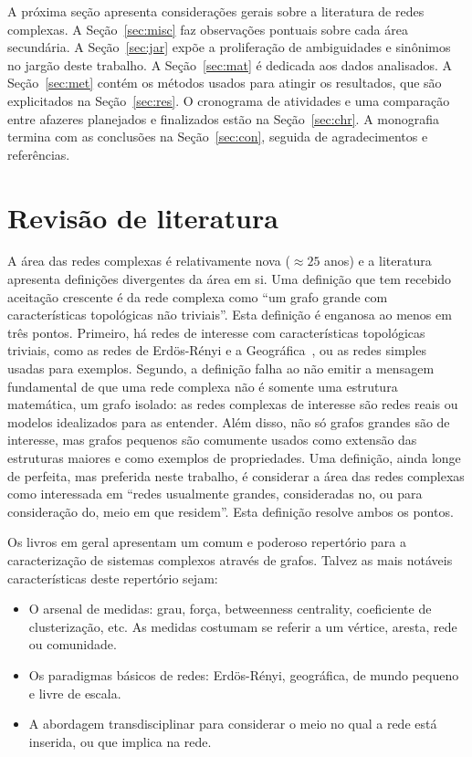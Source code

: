 \documentclass[a4paper,openright,12pt]{report} %
\begin{document}
A próxima seção apresenta considerações gerais sobre a literatura de redes complexas.
A Seção~\ref{sec:misc} faz observações pontuais sobre cada área secundária.
A Seção~\ref{sec:jar} expõe a proliferação de ambiguidades e sinônimos
no jargão deste trabalho.
A Seção~\ref{sec:mat} é dedicada aos dados analisados.
A Seção~\ref{sec:met} contém os métodos usados para atingir os resultados, que são explicitados na Seção~\ref{sec:res}. O cronograma de atividades e uma comparação entre afazeres planejados e finalizados
estão na Seção~\ref{sec:chr}.
A monografia termina com as conclusões na Seção~\ref{sec:con}, seguida de agradecimentos e referências.

\section{Revisão de literatura}
A área das redes complexas é relativamente nova ($\approx 25$ anos)
e a literatura apresenta definições divergentes da área em si.
Uma definição que tem recebido aceitação crescente
é da rede complexa como ``um grafo grande com características topológicas
não triviais''. Esta definição é enganosa ao menos em três pontos.
Primeiro, há redes de interesse com características topológicas triviais, como as redes de Erdös-Rényi e a Geográfica~\cite{newmanBook}, ou as redes simples usadas para exemplos.
Segundo, a definição falha ao não emitir a mensagem fundamental de que uma rede complexa não é somente uma estrutura matemática, um grafo isolado: as redes complexas de interesse são redes reais ou modelos idealizados para as entender.
Além disso, não só grafos grandes são de interesse, mas grafos pequenos são comumente usados como extensão das estruturas maiores e como exemplos de propriedades.
Uma definição, ainda longe de perfeita, mas preferida neste trabalho, é considerar a área das redes complexas como interessada em
``redes usualmente grandes, consideradas no, ou para consideração do,
meio em que residem''.
Esta definição resolve ambos os pontos.

Os livros em geral apresentam um comum e poderoso repertório para a caracterização de sistemas complexos através de grafos. Talvez as mais notáveis características deste repertório sejam:
\begin{itemize}
    \item O arsenal de medidas: grau, força, betweenness centrality, coeficiente de clusterização, etc. As medidas costumam se referir a um vértice, aresta, rede ou comunidade.
    \item Os paradigmas básicos de redes: Erdös-Rényi, geográfica, de mundo pequeno e livre de escala.
    \item A abordagem transdisciplinar para considerar o meio no qual a rede está inserida, ou que implica na rede.
\end{itemize}
\end{document}
